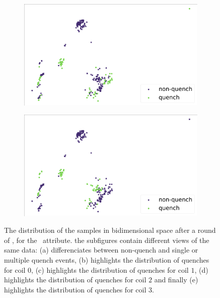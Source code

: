 \begin{figure}[!ht]
\begin{subfigure}{0.49\linewidth}
		\subcaption{}
	\end{subfigure}
	\begin{subfigure}{0.49\linewidth}
		\includegraphics[width=\linewidth]{img/quench_dist_qlp/quenches_coil_2_Cnmod.png}
		\subcaption{}
	\end{subfigure}
	\begin{subfigure}{0.49\linewidth}
		\includegraphics[width=\linewidth]{img/quench_dist_qlp/quenches_coil_3_Cnmod.png}
		\subcaption{}
	\end{subfigure}
	\caption{The distribution of the samples in bidimensional space after a round of \pca, for
		the \cnmod\ attribute. the subfigures contain different views of the same data: (a) differenciates between non-quench and single or multiple quench events, (b) highlights the distribution of quenches for coil $0$, (c) highlights the distribution of quenches for coil $1$, (d) highlights the distribution of quenches for coil $2$ and finally (e) highlights the distribution of quenches for coil $3$.}
	\label{fig:cnmod-coilq-dist}
\end{figure}

